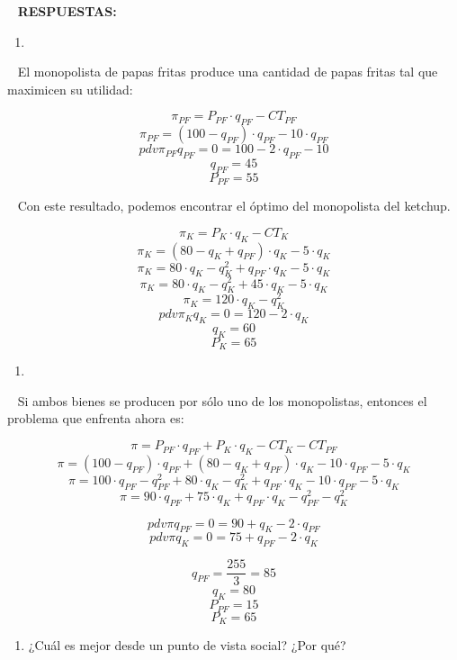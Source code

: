 \documentclass[
  letterpaper,
  DIV=11,
  numbers=noendperiod]{scrreport}
\providecommand{\tightlist}{%
  \setlength{\itemsep}{0pt}\setlength{\parskip}{0pt}}\usepackage{longtable,booktabs,array}
\begin{document}
~ \textbf{RESPUESTAS:}

\begin{enumerate}
\def\labelenumi{\alph{enumi})}
\tightlist
\item
\end{enumerate}

~ El monopolista de papas fritas produce una cantidad de papas fritas
tal que maximicen su utilidad:

\[\pi_{PF}= P_{PF}\cdot q_{PF} - CT_{PF}\]
\[\pi_{PF}= (100 - q_{PF})\cdot q_{PF} - 10\cdot q_{PF}\]
\[pdv {\pi_{PF}}{q_{PF}}=0= 100-2\cdot q_{PF} - 10\] \[q_{PF} = 45\]
\[P_{PF} = 55\]

~ Con este resultado, podemos encontrar el óptimo del monopolista del
ketchup.

\[\pi_{K}= P_{K}\cdot q_{K} - CT_{K}\]
\[\pi_{K}= (80 - q_{K} + q_{PF} )\cdot q_{K} - 5\cdot q_{K}\]
\[\pi_{K}= 80\cdot q_{K} - q_{K}^2 + q_{PF}\cdot q_{K} - 5\cdot q_{K}\]
\[\pi_{K}= 80\cdot q_{K} - q_{K}^2 + 45\cdot q_{K}  - 5\cdot q_{K}\]
\[\pi_{K}= 120\cdot q_{K} - q_{K}^2\]
\[pdv {\pi_{K}}{q_{K}}=0= 120-2\cdot q_{K}\] \[q_{K} = 60\]
\[P_{K} = 65\]

\begin{enumerate}
\def\labelenumi{\alph{enumi})}
\setcounter{enumi}{1}
\tightlist
\item
\end{enumerate}

~ Si ambos bienes se producen por sólo uno de los monopolistas, entonces
el problema que enfrenta ahora es:

\[\pi= P_{PF}\cdot q_{PF} + P_{K}\cdot q_{K} - CT_{K} - CT_{PF}\]
\[\pi= (100 - q_{PF})\cdot q_{PF} + (80 - q_{K} + q_{PF} )\cdot q_{K} - 10\cdot q_{PF} - 5\cdot q_{K}\]
\[\pi= 100\cdot q_{PF} - q_{PF}^2 + 80\cdot q_{K} - q_{K}^2  +q_{PF}\cdot q_{K} - 10\cdot q_{PF} - 5\cdot q_{K}\]
\[\pi= 90\cdot q_{PF} +  75\cdot q_{K} + q_{PF}\cdot q_{K} - q_{PF}^2 - q_{K}^2 \]

\[pdv {\pi}{q_{PF}}=0= 90 + q_{K} - 2\cdot q_{PF}\]
\[pdv {\pi}{q_{K}}=0= 75 + q_{PF} - 2\cdot q_{K}\]

\[q_{PF} = \frac{255}{3}= 85\] \[q_{K} = 80\] \[P_{PF} = 15\]
\[P_{K} = 65\]

\begin{enumerate}
\def\labelenumi{\alph{enumi})}
\setcounter{enumi}{2}
\tightlist
\item
  ¿Cuál es mejor desde un punto de vista social? ¿Por qué?
\end{enumerate}
\end{document}

